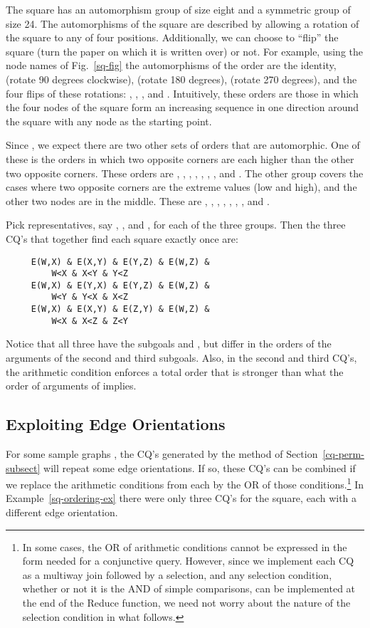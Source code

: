 \begin{example}\label{sq-ordering-ex}
The square has an automorphism group of size eight and a symmetric group of size 24.
The automorphisms of the square are described by allowing a rotation of the square to any of four positions.  Additionally, we can choose to ``flip'' the square (turn the paper on which it is written over) or not.  For example, using the node names of Fig.~\ref{sq-fig} the automorphisms of the order  are the identity,  (rotate 90 degrees clockwise),  (rotate 180 degrees),  (rotate 270 degrees), and the four flips of these rotations: , , , and .  Intuitively, these orders are those in which the four nodes of the square form an increasing sequence in one direction around the square with any node as the starting point.

Since , we expect there are two other sets of orders that are automorphic.  One of these is the orders in which two opposite corners are each higher than the other two opposite corners.  These orders are , , , , , , , and .  The other group covers the cases where two opposite corners are the extreme values (low and high), and the other two nodes are in the middle.  These are , , , , , , , and .

Pick representatives, say , , and , for each of the three groups.  Then the three CQ's that together find each square exactly once are:

\begin{verbatim}
     E(W,X) & E(X,Y) & E(Y,Z) & E(W,Z) &
         W<X & X<Y & Y<Z
     E(W,X) & E(Y,X) & E(Y,Z) & E(W,Z) &
         W<Y & Y<X & X<Z
     E(W,X) & E(X,Y) & E(Z,Y) & E(W,Z) &
         W<X & X<Z & Z<Y
\end{verbatim}
Notice that all three have the subgoals  and , but differ in the orders of the arguments of the second and third subgoals.  Also, in the second and third CQ's, the arithmetic condition enforces a total order that is stronger than what the order of arguments of  implies.
\end{example}

\subsection{Exploiting Edge Orientations}
\label{edge-orient-subsect}

For some sample graphs , the CQ's generated by the method of Section~\ref{cq-perm-subsect} will repeat some edge orientations.  If so, these CQ's can be combined if we replace the arithmetic conditions from each by the OR of those conditions.\footnote{In some cases, the OR of arithmetic conditions cannot be expressed in the form needed for a conjunctive query.  However, since we implement each CQ as a multiway join followed by a selection, and any selection condition, whether or not it is the AND of simple comparisons, can be implemented at the end of the Reduce function, we need not worry about the nature of the selection condition in what follows.}
In Example~\ref{sq-ordering-ex} there were only three CQ's for the square, each with a different edge orientation.

